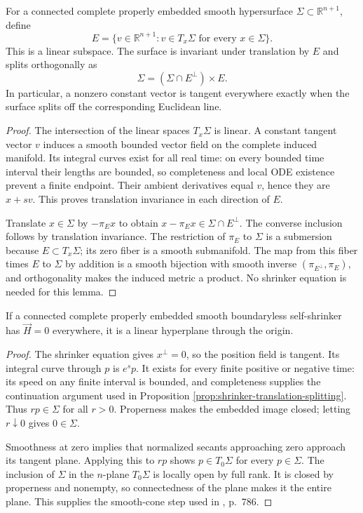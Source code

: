 \begin{proposition}\label{prop:shrinker-translation-splitting}
For a connected complete properly embedded smooth hypersurface $\Sigma\subset\mathbb R^{n+1}$, define
\[
 E=\{v\in\mathbb R^{n+1}:v\in T_x\Sigma\text{ for every }x\in\Sigma\}.
\]
This is a linear subspace. The surface is invariant under translation by $E$ and splits orthogonally as
\[
 \Sigma=(\Sigma\cap E^\perp)\times E.
\]
In particular, a nonzero constant vector is tangent everywhere exactly when the surface splits off the corresponding Euclidean line.
\end{proposition}
\begin{proof}
The intersection of the linear spaces $T_x\Sigma$ is linear. A constant tangent vector $v$ induces a smooth bounded vector field on the complete induced manifold. Its integral curves exist for all real time: on every bounded time interval their lengths are bounded, so completeness and local ODE existence prevent a finite endpoint. Their ambient derivatives equal $v$, hence they are $x+sv$. This proves translation invariance in each direction of $E$.

Translate $x\in\Sigma$ by $-\pi_Ex$ to obtain $x-\pi_Ex\in\Sigma\cap E^\perp$. The converse inclusion follows by translation invariance. The restriction of $\pi_E$ to $\Sigma$ is a submersion because $E\subset T_x\Sigma$; its zero fiber is a smooth submanifold. The map from this fiber times $E$ to $\Sigma$ by addition is a smooth bijection with smooth inverse $(\pi_{E^\perp},\pi_E)$, and orthogonality makes the induced metric a product. No shrinker equation is needed for this lemma.
\end{proof}

\begin{lemma}\label{lem:minimal-shrinker-plane}
If a connected complete properly embedded smooth boundaryless self-shrinker has $\vec H=0$ everywhere, it is a linear hyperplane through the origin.
\end{lemma}
\begin{proof}
The shrinker equation gives $x^\perp=0$, so the position field is tangent. Its integral curve through $p$ is $e^sp$. It exists for every finite positive or negative time: its speed on any finite interval is bounded, and completeness supplies the continuation argument used in Proposition \ref{prop:shrinker-translation-splitting}. Thus $rp\in\Sigma$ for all $r>0$. Properness makes the embedded image closed; letting $r\downarrow0$ gives $0\in\Sigma$.

Smoothness at zero implies that normalized secants approaching zero approach its tangent plane. Applying this to $rp$ shows $p\in T_0\Sigma$ for every $p\in\Sigma$. The inclusion of $\Sigma$ in the $n$-plane $T_0\Sigma$ is locally open by full rank. It is closed by properness and nonempty, so connectedness of the plane makes it the entire plane. This supplies the smooth-cone step used in \cite{CM12}, p.~786.
\end{proof}

